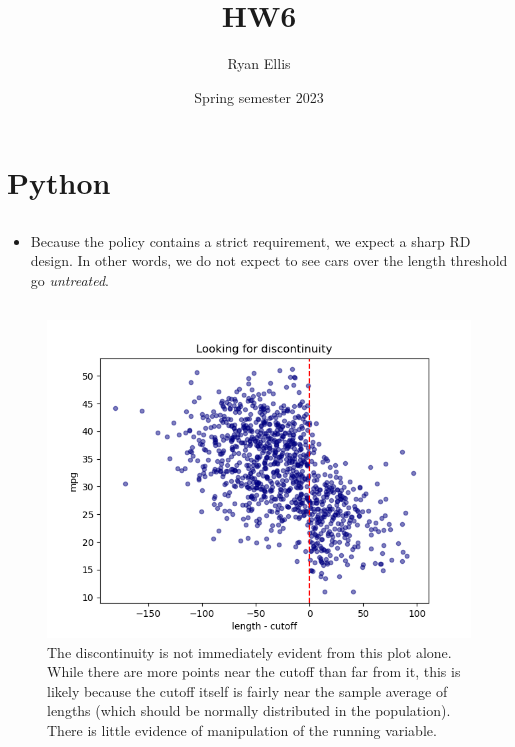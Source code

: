 \documentclass{article}
\title{HW6}
\author{Ryan Ellis}
\date{Spring semester 2023}
\begin{document}
  
\maketitle

\section{Python}
\subsection{}
\begin{itemize}
    \item Because the policy contains a strict requirement, we expect a sharp RD design. In other words, we do not expect to see cars over the length threshold go \textit{untreated}.
\end{itemize}

\subsection{}
\begin{figure}[!h]
    \centering
    \includegraphics[scale=.9]{homework6/output/scatterplot.png}
    \caption{The discontinuity is not immediately evident from this plot alone. While there are more points near the cutoff than far from it, this is likely because the cutoff itself is fairly near the sample average of lengths (which should be normally distributed in the population). There is little evidence of manipulation of the running variable.}
    \label{fig:my_label}
\end{figure}
\end{document}
